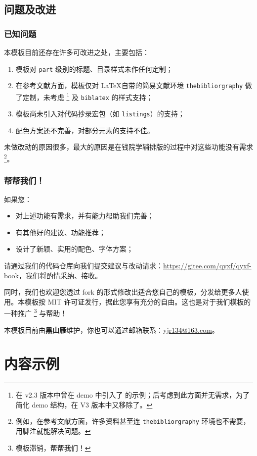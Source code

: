 \documentclass[
    10pt,
    oneside,
    openany,
    b5paper,
    colorscheme = basic  %
]{qyxf-book}
\begin{document}
\section{问题及改进}

\subsection{已知问题}

本模板目前还存在许多可改进之处，主要包括：
\begin{enumerate}
    \item 模板对 \verb|part| 级别的标题、目录样式未作任何定制；
    \item 在参考文献方面，模板仅对 \LaTeX 自带的简易文献环境 \verb|thebibliorgraphy| 做了定制，未考虑 
    \footnote{在 v2.3 版本中曾在 demo 中引入了  的示例；后考虑到此方面并无需求，为了简化 demo 结构，在 V3 版本中又移除了。}
    及 \verb|biblatex| 的样式支持；
    \item 模板尚未引入对代码抄录宏包（如 \verb|listings|）的支持；
    \item 配色方案还不完善，对部分元素的支持不佳。
\end{enumerate}
未做改动的原因很多，最大的原因是在钱院学辅排版的过程中对这些功能没有需求
\footnote{例如，在参考文献方面，许多资料甚至连 \texttt{thebibliorgraphy} 环境也不需要，用脚注就能解决问题。}。

\subsection{帮帮我们！}

如果您：
\begin{itemize}
    \item 对上述功能有需求，并有能力帮助我们完善；
    \item 有其他好的建议、功能推荐；
    \item 设计了新颖、实用的配色、字体方案；
\end{itemize}
请通过我们的代码仓库向我们提交建议与改动请求：\url{https://gitee.com/qyxf/qyxf-book}，我们将酌情采纳、接收。

同时，我们也欢迎您透过 fork 的形式修改出适合您自己的模板，分发给更多人使用。本模板按 MIT 许可证发行，据此您享有充分的自由。这也是对于我们模板的一种推广
\footnote{模板滞销，帮帮我们！}
与帮助！

本模板目前由\textbf{黑山雁}维护，你也可以通过邮箱联系：\url{yjr134@163.com}。

\chapter{内容示例}
\end{document}
